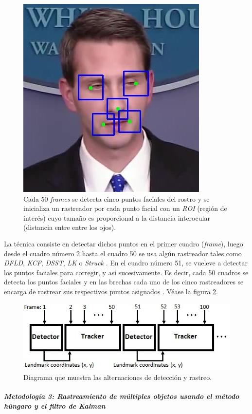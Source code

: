\documentclass[a4paper,openright,12pt]{report}
\begin{document}
\begin{figure}[H]
  \centering
    \includegraphics[width=0.3\columnwidth]{../images/landmark-tracking-1.png}\par
  \caption{Cada 50 \textit{frames} se detecta cinco puntos faciales del rostro y
    se inicializa un rastreador por cada punto facial con un \textit{ROI}
    (región de interés) cuyo tamaño es proporcional a la distancia interocular
    (distancia entre entre los ojos).}
  \label{fig:landmark-tracking-5-keypoints}
\end{figure}

La técnica consiste en detectar dichos puntos en el primer cuadro
(\textit{frame}), luego desde el cuadro número 2 hasta el cuadro 50 se usa algún
rastreador tales como \textit{DFLD}, \textit{KCF}, \textit{DSST}, \textit{LK} o
\textit{Struck} \cite{wettum2017facial}. En el cuadro número 51, se vueleve a
detectar los puntos faciales para corregir, y así sucesivamente. Es decir,
cada 50 cuadros se detecta los puntos faciales y en las brechas cada uno de los
cinco rastreadores se encarga de rastrear sus respectivos puntos asignados
\cite{wettum2017facial}. Véase la figura \ref{fig:landmark-tracking-diagram}.\\

\begin{figure}[H]
  \centering
    \includegraphics[width=0.5\columnwidth]{../images/landmark-tracking-2.png}\par
  \caption{Diagrama que muestra las alternaciones de detección y rastreo.}
  \label{fig:landmark-tracking-diagram}
\end{figure}


\subparagraph{Metodología 3: Rastreamiento de múltiples objetos usando el
método húngaro y el filtro de Kalman}
\mbox{} \\
\end{document}
